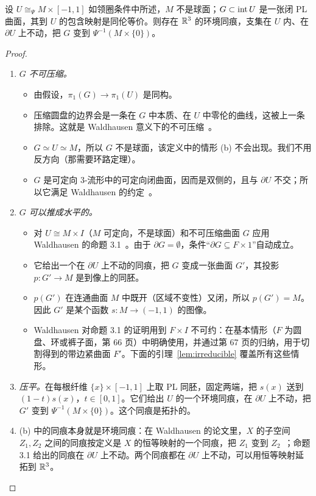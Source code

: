 \begin{lemma}[水平化]\label{lem:horizontal}
设 $U\cong_{\Psi}M\times[-1,1]$ 如领圈条件中所述，$M$ 不是球面；$G\subset\operatorname{int} U$ 是一张闭 PL 曲面，其到 $U$ 的包含映射是同伦等价。则存在 $\mathbb{R}^3$ 的环境同痕，支集在 $U$ 内、在 $\partial U$ 上不动，把 $G$ 变到 $\Psi^{-1}(M\times\{0\})$。
\end{lemma}
\begin{proof}
\begin{enumerate}
\item[(a)] \emph{$G$ 不可压缩。}
  \begin{itemize}
  \item 由假设，$\pi_1(G)\to\pi_1(U)$ 是同构。
  \item 压缩圆盘的边界会是一条在 $G$ 中本质、在 $U$ 中零伦的曲线，这被上一条排除。这就是 Waldhausen 意义下的不可压缩~\cite[p.~58]{Waldhausen68}。
  \item $G\simeq U\simeq M$，所以 $G$ 不是球面，该定义中的情形 (b) 不会出现。我们不用反方向（那需要环路定理）。
  \item $G$ 是可定向 3-流形中的可定向闭曲面，因而是双侧的，且与 $\partial U$ 不交；所以它满足 Waldhausen 的约定~\cite[\S0]{Waldhausen68}。
  \end{itemize}
\item[(b)] \emph{$G$ 可以推成水平的。}
  \begin{itemize}
  \item 对 $U\cong M\times I$（$M$ 可定向，不是球面）和不可压缩曲面 $G$ 应用 Waldhausen 的命题 3.1~\cite[pp.~65--68]{Waldhausen68}。由于 $\partial G=\emptyset$，条件``$\partial G\subseteq F\times1$''自动成立。
  \item 它给出一个在 $\partial U$ 上不动的同痕，把 $G$ 变成一张曲面 $G'$，其投影 $p\colon G'\to M$ 是到像上的同胚。
  \item $p(G')$ 在连通曲面 $M$ 中既开（区域不变性）又闭，所以 $p(G')=M$。因此 $G'$ 是某个函数 $s\colon M\to(-1,1)$ 的图像。
  \item Waldhausen 对命题 3.1 的证明用到 $F\times I$ 不可约：在基本情形（$F$ 为圆盘、环或裤子面，第 66 页）中明确使用，并通过第 67 页的归纳，用于切割得到的带边紧曲面 $F'$。下面的引理~\ref{lem:irreducible} 覆盖所有这些情形。
  \end{itemize}
\item[(c)] \emph{压平。}在每根纤维 $\{x\}\times[-1,1]$ 上取 PL 同胚，固定两端，把 $s(x)$ 送到 $(1-t)s(x)$，$t\in[0,1]$。它们给出 $U$ 的一个环境同痕，在 $\partial U$ 上不动，把 $G'$ 变到 $\Psi^{-1}(M\times\{0\})$。这个同痕是拓扑的。
\item[(d)] (b) 中的同痕本身就是环境同痕：在 Waldhausen 的论文里，$X$ 的子空间 $Z_1,Z_2$ 之间的同痕按定义是 $X$ 的恒等映射的一个同痕，把 $Z_1$ 变到 $Z_2$~\cite[p.~57]{Waldhausen68}；命题 3.1 给出的同痕在 $\partial U$ 上不动。两个同痕都在 $\partial U$ 上不动，可以用恒等映射延拓到 $\mathbb{R}^3$。
\end{enumerate}
\end{proof}

